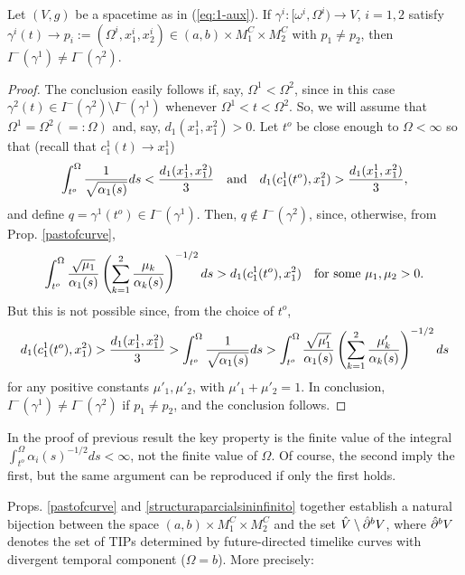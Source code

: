 \begin{prop}\label{structuraparcialsininfinito}
  Let $(V,g)$ be a {\multiwarped} spacetime as in (\ref{eq:1-aux}). If $\gamma^i:[\omega^i,\Omega^i)\rightarrow V$, $i=1,2$ satisfy $\gamma^i(t)\rightarrow p_i:=(\Omega^i,x_1^i,x_2^i)\in (a,b)\times M_1^C\times M_2^C$ with $p_1\neq p_2$, then $I^-(\gamma^1)\neq I^-(\gamma^2)$.
\end{prop}
\begin{proof}
    The conclusion easily follows if, say, $\Omega^1<\Omega^2$, since in this case $\gamma^2(t)\in I^-(\gamma^2)\setminus I^-(\gamma^1)$ whenever $\Omega^1<t<\Omega^2$. So, we will assume that $\Omega^1=\Omega^2(=:\Omega)$ and, say, $d_1(x_1^1,x_1^2)>0$. Let $t^o$ be close enough to $\Omega<\infty$ so that (recall that $c_1^1(t)\rightarrow x_1^1$)
 \[
\int_{t^o}^{\Omega}\frac{1}{\sqrt{\alpha_1(s)}}ds<\frac{d_1(x_1^1,x_1^2)}{3}\quad\hbox{and}\quad d_1(c_1^1(t^o),x_1^2)>\frac{d_1(x_1^1,x_1^2)}{3},
    \]
and define $q=\gamma^1(t^o)\in I^-(\gamma^1)$.   %
    Then, $q\not\in I^-(\gamma^2)$, since, otherwise, from Prop. \ref{pastofcurve},
    \[
\int_{t^{o}}^{\Omega} \frac{\sqrt{\mu_{1}}}{\alpha_{1}(s)}\left(\sum_{k=1}^{2} \frac{\mu_{k}}{\alpha_{k}(s)} \right)^{-1/2}ds >
d_{1}(c^{1}_{1}(t^o),x^{2}_{1})\quad\hbox{for some $\mu_1,\mu_2>0$}.
      \]
      But this is not possible since, from the choice of $t^o$,
      \[
d_1(c^1_1(t^o),x^2_1)>\frac{d_1(x^1_1,x^2_1)}{3}>\int_{t^o}^{\Omega}\frac{1}{\sqrt{\alpha_1(s)}}ds>\int_{t^{o}}^{\Omega} \frac{\sqrt{\mu'_{1}}}{\alpha_{1}(s)}\left(\sum_{k=1}^{2} \frac{\mu'_{k}}{\alpha_{k}(s)} \right)^{-1/2}ds      \]
   for any positive constants $\mu'_1,\mu'_2$, with $\mu'_1+\mu'_2=1$. In conclusion, $I^-(\gamma^1)\neq I^-(\gamma^2)$ if $p_1\neq p_2$, and the conclusion follows.
\end{proof}
\begin{rem}\label{rem:1} In the proof of previous result the key property is the finite value of the integral $\int_{t^o}^{\Omega}\alpha_i(s)^{-1/2}ds<\infty$, not the finite value of $\Omega$. Of course, the second imply the first, but the same argument can be reproduced if only the first holds.
%
  \end{rem}
\noindent Props. \ref{pastofcurve} and \ref{structuraparcialsininfinito} together establish a natural bijection between the space $(a,b) \times M_1^C\times M_2^C$ and the set $\hat{V}\setminus \hat{\partial}^{{\color{black} b}} V$, where $\hat{\partial}^{{\color{black} b}} V$ denotes the set of TIPs determined by future-directed timelike curves with divergent temporal component ($\Omega=b$). More precisely:

